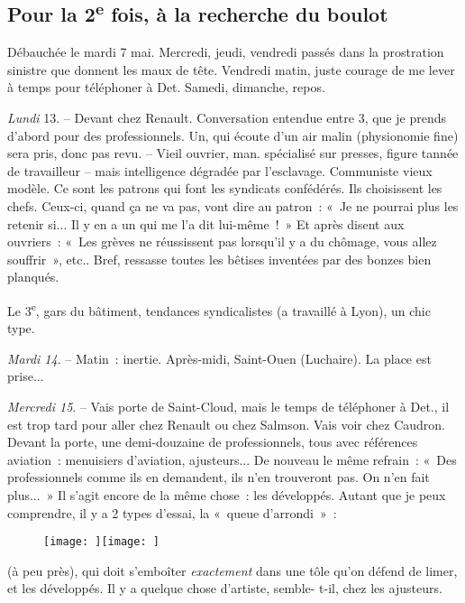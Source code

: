 \documentclass[french,twoside]{book} %
\begin{document}
\subsection[Pour la 2e fois, à la recherche du boulot]{Pour la 2\textsuperscript{e} fois, à la recherche du boulot}
\noindent \par
Débauchée le mardi 7 mai. Mercredi, jeudi, vendredi passés dans la prostration sinistre que donnent les maux de tête. Vendredi matin, juste courage de me lever à temps pour téléphoner à Det. Samedi, dimanche, repos.\par
{\itshape Lundi} 13. – Devant chez Renault. Conversation entendue entre 3, que je prends d'abord pour des professionnels. Un, qui écoute d'un air malin (physionomie fine) sera pris, donc pas revu. – Vieil ouvrier, man. spécialisé sur presses, figure tannée de travailleur – mais intelligence dégradée par l'esclavage. Communiste vieux modèle. Ce sont les patrons qui font les syndicats confédérés. Ils choisissent les chefs. Ceux-ci, quand ça ne va pas, vont dire au patron : « Je ne pourrai plus les retenir si... Il y en a un qui me l'a dit lui-même ! » Et après disent aux ouvriers : « Les grèves ne réussissent pas lorsqu'il y a du chômage, vous allez souffrir », etc.. Bref, ressasse toutes les bêtises inventées par des bonzes bien planqués.\par
Le 3\textsuperscript{e}, gars du bâtiment, tendances syndicalistes (a travaillé à Lyon), un chic type.\par
{\itshape Mardi 14}. – Matin : inertie. Après-midi, Saint-Ouen (Luchaire). La place est prise...\par
{\itshape Mercredi 15}. – Vais porte de Saint-Cloud, mais le temps de téléphoner à Det., il est trop tard pour aller chez Renault ou chez Salmson. Vais voir chez Caudron. Devant la porte, une demi-douzaine de professionnels, tous avec références aviation : menuisiers d'aviation, ajusteurs... De nouveau le même refrain : « Des professionnels comme ils en demandent, ils n'en trouveront pas. On n'en fait plus... » Il s'agit encore de la même chose : les développés. Autant que je peux comprendre, il y a 2 types d'essai, la « queue d'arrondi » : \begin{figure}[htbp]
\noindent\noindent\texttt{[image: ]}\texttt{[image: ]}\end{figure}
 (à peu près), qui doit s'emboîter {\itshape exactement} dans une tôle qu'on défend de limer, et les développés. Il y a quelque chose d'artiste, semble- t-il, chez les ajusteurs.\par
\end{document}
